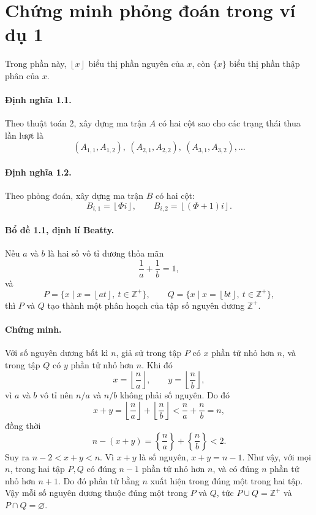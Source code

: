 \documentclass[11pt]{article}
\newcommand{\floor}[1]{\left\lfloor #1\right\rfloor}
\begin{document}
\appendix

\section{Chứng minh phỏng đoán trong ví dụ 1}

Trong phần này, \(\floor{x}\) biểu thị phần nguyên của \(x\), còn \(\{x\}\)
biểu thị phần thập phân của \(x\).

\paragraph{Định nghĩa 1.1.}
Theo thuật toán 2, xây dựng ma trận \(A\) có hai cột sao cho các trạng thái
thua lần lượt là
\[
  (A_{1,1},A_{1,2}),\ (A_{2,1},A_{2,2}),\
  (A_{3,1},A_{3,2}),\ldots
\]

\paragraph{Định nghĩa 1.2.}
Theo phỏng đoán, xây dựng ma trận \(B\) có hai cột:
\[
  B_{i,1}=\floor{\Phi i},
  \qquad
  B_{i,2}=\floor{(\Phi+1)i}.
\]

\paragraph{Bổ đề 1.1, định lí Beatty.}
Nếu \(a\) và \(b\) là hai số vô tỉ dương thỏa mãn
\[
  \frac{1}{a}+\frac{1}{b}=1,
\]
và
\[
  P=\{x\mid x=\floor{at},\ t\in\mathbb{Z}^{+}\},\qquad
  Q=\{x\mid x=\floor{bt},\ t\in\mathbb{Z}^{+}\},
\]
thì \(P\) và \(Q\) tạo thành một phân hoạch của tập số nguyên dương
\(\mathbb{Z}^{+}\).

\paragraph{Chứng minh.}
Với số nguyên dương bất kì \(n\), giả sử trong tập \(P\) có \(x\) phần tử nhỏ
hơn \(n\), và trong tập \(Q\) có \(y\) phần tử nhỏ hơn \(n\). Khi đó
\[
  x=\floor{\frac{n}{a}},\qquad
  y=\floor{\frac{n}{b}},
\]
vì \(a\) và \(b\) vô tỉ nên \(n/a\) và \(n/b\) không phải số nguyên. Do đó
\[
  x+y
  =
  \floor{\frac{n}{a}}+\floor{\frac{n}{b}}
  <
  \frac{n}{a}+\frac{n}{b}
  =
  n,
\]
đồng thời
\[
  n-(x+y)
  =
  \left\{\frac{n}{a}\right\}+\left\{\frac{n}{b}\right\}
  <2.
\]
Suy ra \(n-2<x+y<n\). Vì \(x+y\) là số nguyên, \(x+y=n-1\). Như vậy, với mọi
\(n\), trong hai tập \(P,Q\) có đúng \(n-1\) phần tử nhỏ hơn \(n\), và có đúng
\(n\) phần tử nhỏ hơn \(n+1\). Do đó phần tử bằng \(n\) xuất hiện trong đúng
một trong hai tập. Vậy mỗi số nguyên dương thuộc đúng một trong \(P\) và
\(Q\), tức \(P\cup Q=\mathbb{Z}^{+}\) và \(P\cap Q=\varnothing\).
\end{document}
